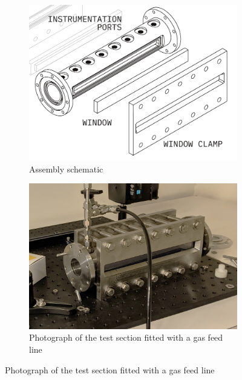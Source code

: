             \begin{figure}[h]
                \centering
                \begin{subfigure}[t]{0.46\textwidth}
                    \centering
                    \includegraphics[width=\textwidth]{assets/3 design/cavitatorDrawing}
                    \caption{Assembly schematic}
                    \label{fig:cavitation_schematic}
                \end{subfigure}
                \hfill
                \begin{subfigure}[t]{0.49\textwidth}
                    \centering
                    \includegraphics[width=\textwidth]{assets/3 design/cavitationSection.jpg}
                    \caption{Photograph of the test section fitted with a gas feed line}

\end{subfigure}
\end{figure}
